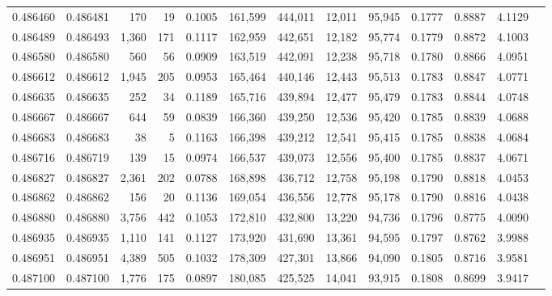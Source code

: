\begin{tabular}{rrrrrrrrrrrrr}
0.486460 & 0.486481 &   170 &    19 &                                     0.1005 & 161,599 & 444,011 &  12,011 &  95,945 & 0.1777 & 0.8887 & 4.1129 \\
0.486489 & 0.486493 & 1,360 &   171 &                                     0.1117 & 162,959 & 442,651 &  12,182 &  95,774 & 0.1779 & 0.8872 & 4.1003 \\
0.486580 & 0.486580 &   560 &    56 &                                     0.0909 & 163,519 & 442,091 &  12,238 &  95,718 & 0.1780 & 0.8866 & 4.0951 \\
0.486612 & 0.486612 & 1,945 &   205 &                                     0.0953 & 165,464 & 440,146 &  12,443 &  95,513 & 0.1783 & 0.8847 & 4.0771 \\
0.486635 & 0.486635 &   252 &    34 &                                     0.1189 & 165,716 & 439,894 &  12,477 &  95,479 & 0.1783 & 0.8844 & 4.0748 \\
0.486667 & 0.486667 &   644 &    59 &                                     0.0839 & 166,360 & 439,250 &  12,536 &  95,420 & 0.1785 & 0.8839 & 4.0688 \\
0.486683 & 0.486683 &    38 &     5 &                                     0.1163 & 166,398 & 439,212 &  12,541 &  95,415 & 0.1785 & 0.8838 & 4.0684 \\
0.486716 & 0.486719 &   139 &    15 &                                     0.0974 & 166,537 & 439,073 &  12,556 &  95,400 & 0.1785 & 0.8837 & 4.0671 \\
0.486827 & 0.486827 & 2,361 &   202 &                                     0.0788 & 168,898 & 436,712 &  12,758 &  95,198 & 0.1790 & 0.8818 & 4.0453 \\
0.486862 & 0.486862 &   156 &    20 &                                     0.1136 & 169,054 & 436,556 &  12,778 &  95,178 & 0.1790 & 0.8816 & 4.0438 \\
0.486880 & 0.486880 & 3,756 &   442 &                                     0.1053 & 172,810 & 432,800 &  13,220 &  94,736 & 0.1796 & 0.8775 & 4.0090 \\
0.486935 & 0.486935 & 1,110 &   141 &                                     0.1127 & 173,920 & 431,690 &  13,361 &  94,595 & 0.1797 & 0.8762 & 3.9988 \\
0.486951 & 0.486951 & 4,389 &   505 &                                     0.1032 & 178,309 & 427,301 &  13,866 &  94,090 & 0.1805 & 0.8716 & 3.9581 \\
0.487100 & 0.487100 & 1,776 &   175 &                                     0.0897 & 180,085 & 425,525 &  14,041 &  93,915 & 0.1808 & 0.8699 & 3.9417 \\

\end{tabular}
